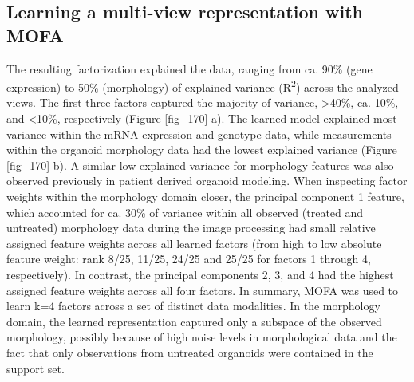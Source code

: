 \begin{flushleft}
\subsection{Learning a multi-view representation with MOFA}

 The resulting factorization explained the data, ranging from ca. 90\% (gene expression) to 50\% (morphology) of explained variance (R\textsuperscript{2}) across the analyzed views. The first three factors captured the majority of variance, >40\%, ca. 10\%, and <10\%, respectively (Figure \ref{fig_170} a). The learned model explained most variance within the mRNA expression and genotype data, while measurements within the organoid morphology data had the lowest explained variance (Figure \ref{fig_170} b). A similar low explained variance for morphology features was also observed previously in patient derived organoid modeling. When inspecting factor weights within the morphology domain closer, the principal component 1 feature, which accounted for ca. 30\% of variance within all observed (treated and untreated) morphology data during the image processing had small relative assigned feature weights across all learned factors (from high to low absolute feature weight: rank 8/25, 11/25, 24/25 and 25/25 for factors 1 through 4, respectively). In contrast, the principal components 2, 3, and 4 had the highest assigned feature weights across all four factors. In summary, MOFA was used to learn k=4 factors across a set of distinct data modalities. In the morphology domain, the learned representation captured only a subspace of the observed morphology, possibly because of high noise levels in morphological data and the fact that only observations from untreated organoids were contained in the support
 set. 


\end{flushleft}
